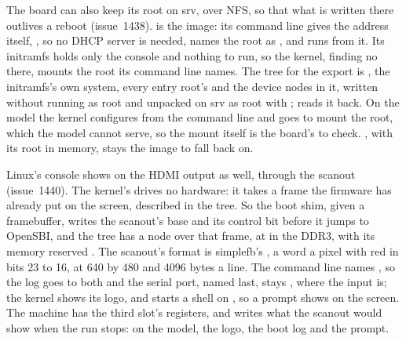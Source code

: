 \documentclass[journal,onecolumn,9pt]{IEEEtran}
\begin{document}
The board can also keep its root on srv, over NFS, so that what is
written there outlives a reboot (issue~1438). 
is the image: its command line gives the address itself,
,
so no DHCP server is needed, names the root as
, and runs
 from it. Its initramfs holds only the console and nothing
to run, so the kernel, finding no  there, mounts the root
its command line names. The tree for the export is
, the initramfs's own system, every entry root's
and the device nodes in it, written without running as root and
unpacked on srv as root with ; 
reads it back. On the model the kernel configures  from the
command line and goes to mount the root, which the model cannot serve,
so the mount itself is the board's to check. , with
its root in memory, stays the image to fall back on.

Linux's console shows on the HDMI output as well, through the
scanout (issue~1440). The kernel's  drives no hardware:
it takes a frame the firmware has already put on the screen, described
in the tree. So the boot shim, given a framebuffer, writes the
scanout's base and its control bit before it jumps to OpenSBI, and the
tree has a  node over that frame, at
 in the DDR3, with its memory reserved
. The scanout's format is simplefb's
, a word a pixel with red in bits 23 to 16, at 640 by
480 and 4096 bytes a line. The command line names
, so the log goes to both and the
serial port, named last, stays , where the input
is; the kernel shows its logo, and  starts a shell on
, so a prompt shows on the screen. The machine has the
third slot's registers, and  writes what the scanout
would show when the run stops: on the model, the logo, the boot log
and the prompt.
\end{document}
